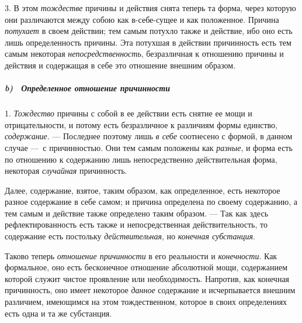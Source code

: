 3. В этом {\em тождестве} причины и действия снята
теперь та форма, через которую они различаются между собою как в-себе-сущее
и как положенное. Причина {\em потухает} в своем
действии; тем самым потухло также и действие, ибо оно есть лишь
определенность причины. Эта потухшая в действии причинность есть тем самым
некоторая {\em непосредственность}, безразличная к
отношению причины и действия и содержащая в себе это отношение внешним
образом.

\subparagraph[b) \ Определенное отношение причинности]{b) \ Определенное
отношение причинности}
\hypertarget{Toc478978772}{}1. {\em Тождество} причины с
собой в ее действии есть снятие ее мощи и отрицательности, и потому есть
безразличное к различиям формы единство,
{\em содержание}. — Последнее поэтому лишь
{\em в себе} соотнесено с формой, в данном случае —~с
причинностью. Они тем самым положены как {\em разные},
и форма есть по отношению к содержанию лишь непосредственно действительная
форма, некоторая {\em случайная} причинность.

Далее, содержание, взятое, таким образом, как определенное, есть некоторое
разное содержание в себе самом; и причина определена по своему содержанию,
а тем самым и действие также определено таким образом. — Так как здесь
рефлектированность есть также и непосредственная действительность, то
содержание есть постольку {\em действительная}, но
{\em конечная субстанция}.

Таково теперь {\em отношение причинности} в его
реальности и {\em конечности}. Как формальное, оно есть
бесконечное отношение абсолютной мощи, содержанием которой служит чистое
проявление или необходимость. Напротив, как конечная причинность, оно имеет
некоторое {\em данное} содержание и исчерпывается
внешним различием, имеющимся на этом тождественном, которое в своих
определениях есть одна и та же субстанция.

